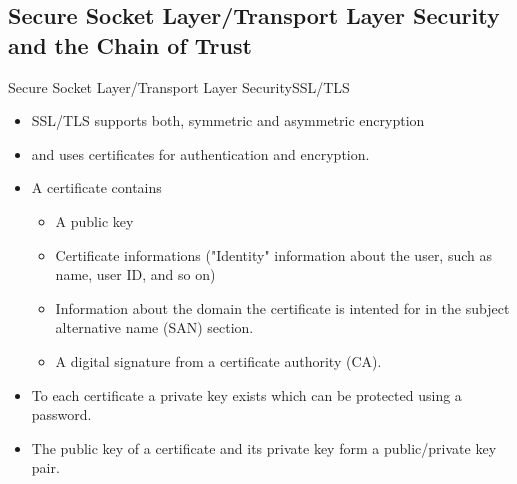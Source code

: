 ﻿\subsection{Secure Socket Layer/Transport Layer Security and the Chain of Trust}

\begin{frame}{\alert{S}ecure \alert{S}ocket \alert{L}ayer/\alert{T}ransport \alert{L}ayer \alert{S}ecurity}{SSL/TLS}
    \begin{itemize}
        \item \alert{SSL/TLS} supports both, \alert{symmetric} and \alert{asymmetric} encryption
        \item and uses \alert{certificates} for \alert{authentication} and \alert{encryption}.
        \item A certificate contains
        \begin{itemize}
            \item A \alert{public key}
            \item Certificate \alert{informations} ("Identity" information about the user, such as name, user ID, and so on)
            \item Information about the \alert{domain} the certificate is \alert{intented for} in the \alert{subject alternative name (SAN)} section.
            \item A \alert{digital signature} from a \alert{certificate authority (CA)}.
        \end{itemize}
        \item To \alert{each} certificate a \alert{private key} exists which can be protected using a password.
        \item The \alert{public key} of a certificate and its \alert{private key} form a \alert{public/private} key pair.
    \end{itemize}
\end{frame}
